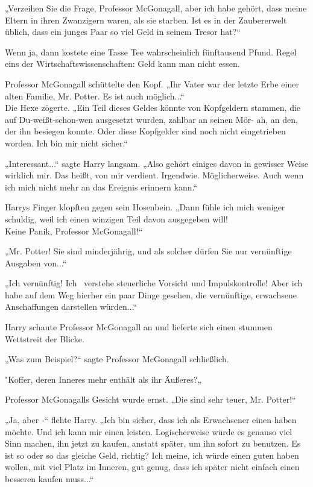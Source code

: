 {„Verzeihen Sie die Frage, Professor McGonagall, aber ich habe gehört, dass meine Eltern in ihren Zwanzigern waren, als sie starben. Ist es in der Zaubererwelt üblich, dass ein junges Paar so viel Geld in seinem Tresor hat?“

Wenn ja, dann kostete eine Tasse Tee wahrscheinlich fünftausend Pfund. Regel eins der Wirtschaftswissenschaften: Geld kann man nicht essen.

Professor McGonagall schüttelte den Kopf. „Ihr Vater war der letzte Erbe einer alten Familie, Mr. Potter. Es ist auch möglich...“\\ Die Hexe zögerte. „Ein Teil dieses Geldes könnte von Kopfgeldern stammen, die auf Du-weißt-schon-wen ausgesetzt wurden, zahlbar an seinen Mör- ah, an den, der ihn besiegen konnte. Oder diese Kopfgelder sind noch nicht eingetrieben worden. Ich bin mir nicht sicher.“

„Interessant...“ sagte Harry langsam. „Also gehört einiges davon in gewisser Weise wirklich mir. Das heißt, von mir verdient. Irgendwie. Möglicherweise. Auch wenn ich mich nicht mehr an das Ereignis erinnern kann.“

Harrys Finger klopften gegen sein Hosenbein. „Dann fühle ich mich weniger schuldig, weil ich einen winzigen Teil davon ausgegeben will!\\ Keine Panik, Professor McGonagall!“

„Mr. Potter! Sie sind minderjährig, und als solcher dürfen Sie nur vernünftige Ausgaben von...“

„Ich vernünftig! Ich ~verstehe steuerliche Vorsicht und Impulskontrolle! Aber ich habe auf dem Weg hierher ein paar Dinge gesehen, die vernünftige, erwachsene Anschaffungen darstellen würden...“

Harry schaute Professor McGonagall an und lieferte sich einen stummen Wettstreit der Blicke.

„Was zum Beispiel?“ sagte Professor McGonagall schließlich.

"Koffer, deren Inneres mehr enthält als ihr Äußeres?„

Professor McGonagalls Gesicht wurde ernst. „Die sind sehr teuer, Mr. Potter!“

„Ja, aber -“ flehte Harry. „Ich bin sicher, dass ich als Erwachsener einen haben möchte. Und ich kann mir einen leisten. Logischerweise würde es genauso viel Sinn machen, ihn jetzt zu kaufen, anstatt später, um ihn sofort zu benutzen. Es ist so oder so das gleiche Geld, richtig? Ich meine, ich würde einen guten haben wollen, mit viel Platz im Inneren, gut genug, dass ich später nicht einfach einen besseren kaufen muss...“

}
